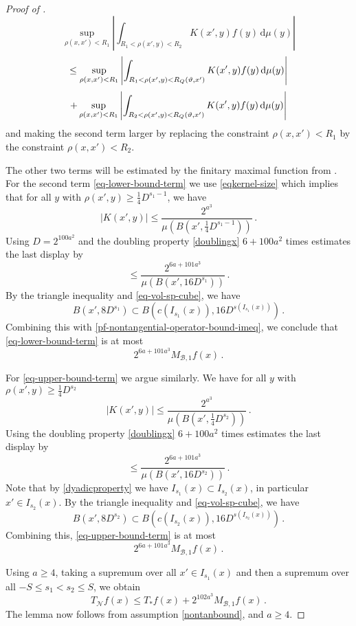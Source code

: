 \begin{proof}[Proof of ]
\begin{equation}
    \sup_{\rho(x,x')<R_1}
        \left|\int_{R_1< \rho(x',y) < R_2} K(x',y) f(y) \, \mathrm{d}\mu(y) \right|
    \end{equation}
    \begin{equation}
    \le \sup_{\rho(x,x')<R_1}
        \left|\int_{R_1< \rho(x',y) < R_{{Q}}({\vartheta},x')} K(x',y) f(y) \, \mathrm{d}\mu(y) \right|
    \end{equation}
    \begin{equation}
        + \sup_{\rho(x,x')<R_1}
        \left|\int_{R_2< \rho(x',y) < R_{{Q}}({\vartheta},x')} K(x',y) f(y) \, \mathrm{d}\mu(y) \right|
    \end{equation}
    and making the second term larger by replacing the
    constraint $\rho(x,x')<R_1$ by the constraint $\rho(x,x')<R_2$.


    The other two terms will be estimated by the finitary maximal function from .
    For the second term \eqref{eq-lower-bound-term} we use \eqref{eqkernel-size} which implies that for all $y$ with $\rho(x', y) \ge \frac{1}{4}D^{s_1 - 1}$, we have
    $$
        |K(x', y)| \le \frac{2^{a^3}}{\mu(B(x', \frac{1}{4}D^{s_1 - 1}))}\,.
    $$
    Using $D=2^{100a^2}$
    and the doubling property \eqref{doublingx} $6 +100a^2$ times estimates
    the last display by
    \begin{equation}
    \label{pf-nontangential-operator-bound-imeq}
        \le \frac{2^{6a+101a^3}}{\mu(B(x', 16D^{s_1}))}\, .
    \end{equation}
    By the triangle inequality and \eqref{eq-vol-sp-cube}, we have
    $$
        B(x', 8D^{s_1}) \subset B(c(I_{s_1}(x)), 16D^{s(I_{s_1}(x))})\,.
    $$
    Combining this with \eqref{pf-nontangential-operator-bound-imeq}, we conclude that \eqref{eq-lower-bound-term} is at most
    $$
        2^{6a + 101a^3} M_{\mathcal{B},1} f(x)\,.
    $$

    For \eqref{eq-upper-bound-term} we argue similarly. We have for all $y$ with $\rho(x', y) \ge \frac{1}{4}D^{s_2}$
    $$
        |K(x', y)| \le \frac{2^{a^3}}{\mu(B(x', \frac{1}{4}D^{s_2}))}\,.
    $$
    Using the doubling property \eqref{doublingx} $6 + 100a^2$ times estimates
    the last display by
    \begin{equation}
        \le \frac{2^{6a + 101a^3}}{\mu(B(x', 16 D^{s_2}))}\, .
    \end{equation}
    Note that by \eqref{dyadicproperty} we have $I_{s_1}(x) \subset I_{s_2}(x)$, in particular $x' \in I_{s_2}(x)$.
    By the triangle inequality and \eqref{eq-vol-sp-cube}, we have
    $$
        B(x', 8D^{s_2}) \subset B(c(I_{s_2}(x)), 16D^{s(I_{s_2}(x))})\,.
    $$
    Combining this, \eqref{eq-upper-bound-term} is at most
    $$
        2^{6a+101a^3} M_{\mathcal{B},1} f(x)\,.
    $$

    Using $a \ge 4$, taking a supremum over all $x' \in I_{s_1}(x)$ and then a supremum over all $-S \le s_1 < s_2 \le S$, we obtain
    $$
        T_{\mathcal{N}} f(x) \le T_*f(x) + 2^{102a^3} M_{\mathcal{B},1} f(x)\,.
    $$
    The lemma now follows from assumption \eqref{nontanbound},  and $a \ge 4$.
\end{proof}

